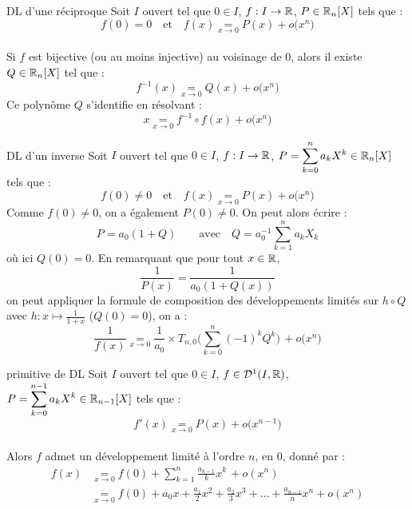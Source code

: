 \begin{adjustwidth}{-3cm}{-3cm}
\begin{proposition}{25.62}{DL d'une réciproque}
    Soit $I$ ouvert tel que $0 \in I$, $f:I \to \mathbb{R}$, $P \in \mathbb{R}_n[X]$ tels que :
    $$f(0) = 0 \quad \text{et} \quad   f(x) \underset{x \to 0}{=} P(x)  + o\bigl(x^n\bigr)$$ \\
    Si $f$ est bijective (ou au moins injective) au voisinage de $0$, alors il existe $Q \in \mathbb{R}_n[X]$ tel que :
    $$f^{-1}(x) \underset{x \to 0}{=} Q(x)  + o\bigl(x^n\bigr)$$
    Ce polynôme $Q$ s'identifie en résolvant :
    $$x \underset{x \to 0}{=} f^{-1} \circ f(x) + o\bigl(x^n\bigr)$$
\end{proposition}

\begin{proposition}{25.65}{DL d'un inverse}
    Soit $I$ ouvert tel que $0 \in I$, $f:I \to \mathbb{R}$, $ \displaystyle P = \sum_{k=0}^{n}a_kX^k \in \mathbb{R}_n[X]$ tels que : 
    $$f(0) \neq 0 \quad \text{et} \quad   f(x) \underset{x \to 0}{=} P(x)  + o\bigl(x^n\bigr)$$
    Comme $f(0) \neq 0$, on a également $P(0) \neq 0$. On peut alors écrire :
    $$P = a_0(1 +  Q ) \qquad \text{avec} \quad Q = a_0^{-1} \sum_{k=1}^{n}a_kX_k$$
    où ici $Q(0) = 0$. En remarquant que pour tout $x \in \mathbb{R}$, 
    $$\frac{1}{P(x)} = \frac{1}{a_0(1+Q(x))}$$
    on peut appliquer la formule de composition des développements limités sur $h \circ Q$ avec $h:x \mapsto \frac{1}{1+x} $ ($Q(0) = 0$), on a :\\
    $$\frac{1}{f(x)} \underset{x \to 0}{=} \frac{1}{a_0} \times T_{n,0}\Biggl(\sum_{k=0}^{n}(-1)^k Q^k\Biggr) \, + o\bigl(x^n\bigr)$$
\end{proposition}

\begin{proposition}{25.65}{primitive de DL}
    Soit $I$ ouvert tel que $0 \in I$, $f \in \mathcal{D}^1(I,\mathbb{R}) $, $ \displaystyle P = \sum_{k=0}^{n-1}a_kX^k \in \mathbb{R}_{n-1}[X]$ tels que :
    $$f'(x) \underset{x \to 0}{=} P(x)  + o\bigl(x^{n-1}\bigr)$$\\
    Alors $f$ admet un développement limité à l'ordre $n$, en $0$, donné par :
    \begin{align*}
        f(x) &\underset{x \to 0}{=} f(0) + \sum_{k=1}^{n} \frac{a_{k-1}}{k} x^k \, + o(x^n) \\
        &\underset{x \to 0}{=} f(0) + a_0x + \frac{a_1}{2}x^2 + \frac{a_2}{3}x^3 + \dots + \frac{a_{n-1}}{n}x^n + o(x^n)
     \end{align*}
\end{proposition}






\end{adjustwidth}
